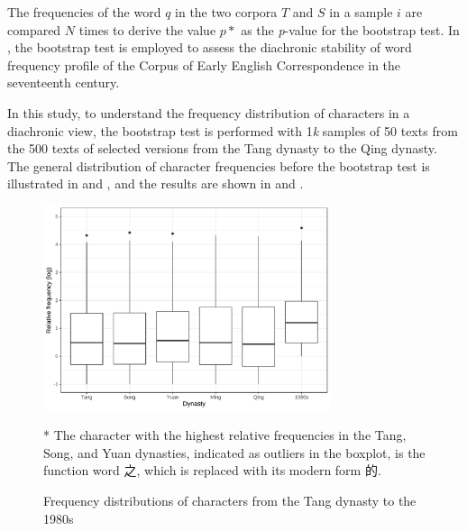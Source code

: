 The frequencies of the word $q$ in the two corpora $T$ and $S$ in a sample $i$ are compared $N$ times to derive the value $p*$ as the \textit{p}-value for the bootstrap test. In \textcite{lijffijt2012ceecing}, the bootstrap test is employed to assess the diachronic stability of word frequency profile of the Corpus of Early English Correspondence in the seventeenth century.

In this study, to understand the frequency distribution of characters in a diachronic view, the bootstrap test is performed with 1\textit{k} samples of 50 texts from the 500 texts of selected versions from the Tang dynasty to the Qing dynasty. The general distribution of character frequencies before the bootstrap test is illustrated in  and , and the results are shown in  and .

\begin{figure}[H]
  \centering
  \begin{threeparttable}
  \includegraphics[width=0.75\textwidth,keepaspectratio]{figures_new/char_freq/char_freq_dist_boxplot.pdf}
    \begin{tablenotes}
      \linespread{1}\footnotesize
      \item[*]\hspace*{-\fontdimen2\font}The character with the highest relative frequencies in the Tang, Song, and Yuan dynasties, indicated as outliers in the boxplot, is the function word 之, which is replaced with its modern form 的.
    \end{tablenotes}
  \end{threeparttable}
  \caption{Frequency distributions of characters from the Tang dynasty to the 1980s}
  \label{fig:freq_dist}
\end{figure}

